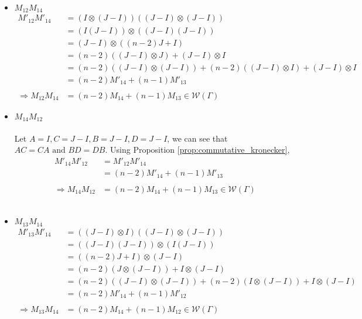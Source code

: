 \documentclass{article}
\begin{document}
\begin{itemize}
\begin{itemize}
        \item $M_{12}M_{14}$ 
        \begin{align*}
            M'_{12}M'_{14} 
            &= (I \otimes (J-I))((J-I) \otimes (J-I)) \\
            &= (I(J-I))\otimes((J-I)(J-I)) \\
            &= (J-I)\otimes((n-2)J + I) \\
            &= (n-2)((J-I)\otimes J) + (J-I)\otimes I \\
            &= (n-2)((J-I)\otimes(J-I)) + (n-2)((J-I)\otimes I) + (J-I)\otimes I \\
            &= (n-2)M'_{14} + (n-1)M'_{13} \\\\
            \Rightarrow M_{12}M_{14} &= (n-2)M_{14} + (n-1)M_{13} \in \mathcal{W}(\Gamma)
        \end{align*}
        
        \item $M_{14}M_{12}$ \\ \\
        Let $A = I, C = J-I, B = J-I, D=J-I$, we can see that $AC=CA \text{ and } BD=DB$. Using Proposition \ref{prop:commutative_kronecker}, 
        \begin{align*}
            M'_{14}M'_{12} &= M'_{12}M'_{14} \\
            &= (n-2)M'_{14} + (n-1)M'_{13} \\ \\
            \Rightarrow M_{14}M_{12} &= (n-2)M_{14} + (n-1)M_{13} \in \mathcal{W}(\Gamma)
        \end{align*} \\
        
        \item $M_{13}M_{14}$ 
        \begin{align*}
            M'_{13}M'_{14} 
            &=((J-I) \otimes I)((J-I) \otimes (J-I)) \\
            &= ((J-I)(J-I))\otimes(I(J-I)) \\
            &= ((n-2)J + I)\otimes (J-I) \\
            &= (n-2)(J\otimes (J-I)) + I\otimes (J-I) \\
            &= (n-2)((J-I)\otimes(J-I)) + (n-2)(I\otimes (J-I)) + I\otimes (J-I) \\
            &= (n-2)M'_{14} + (n-1)M'_{12}  \\ \\
            \Rightarrow M_{13}M_{14} &= (n-2)M_{14} + (n-1)M_{12} \in \mathcal{W}(\Gamma)
        \end{align*}


\end{itemize}
\end{itemize}
\end{document}
